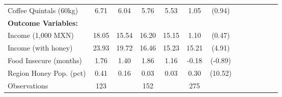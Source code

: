 \begin{table}[htbp]
\begin{tabular}{l*{3}{cccc}}
\addlinespace
Coffee Quintals (60kg)&     6.71&     6.04&     5.76&     5.53&     1.05         &   (0.94)\\
\addlinespace
\textbf{Outcome Variables:}&         &         &         &         &                  &         \\
\addlinespace
Income (1,000 MXN)&    18.05&    15.54&    16.20&    15.15&     1.10         &   (0.47)\\
\addlinespace
Income (with honey)&    23.93&    19.72&    16.46&    15.23&    15.21\sym{***}&   (4.91)\\
\addlinespace
Food Insecure (months)&     1.76&     1.40&     1.86&     1.16&    -0.18         &  (-0.89)\\
\addlinespace
Region Honey Pop. (pct)&     0.41&     0.16&     0.03&     0.03&     0.30\sym{***}&  (10.52)\\
\midrule
Observations    &      123&         &      152&         &      275         &         \\
\bottomrule
\end{tabular}
\end{table}
